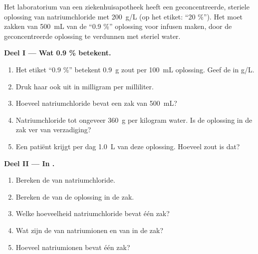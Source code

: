 \begin{problem}
\label{pb:g10:concentration-and-dilution:1}
Het laboratorium van een ziekenhuisapotheek heeft een geconcentreerde,
steriele oplossing van natriumchloride met \qty{200}{g/L} (op het
etiket: ``20 \%''). Het moet zakken van \qty{500}{mL} van de ``0.9 \%''
oplossing voor infusen maken, door de geconcentreerde oplossing te
verdunnen met steriel water.

\medskip
\noindent\textbf{Deel I --- Wat 0.9 \% betekent.}
\begin{enumerate}
  \item Het etiket ``0.9 \%'' betekent \qty{0.9}{g} zout per
        \qty{100}{mL} oplossing. Geef de  in \si{g/L}.
  \item Druk haar ook uit in milligram per milliliter.
  \item Hoeveel natriumchloride bevat een zak van \qty{500}{mL}?
  \item Natriumchloride  tot ongeveer \qty{360}{g} per kilogram
        water. Is de oplossing in de zak ver van verzadiging?
  \item Een patiënt krijgt per dag \qty{1.0}{L} van deze oplossing.
        Hoeveel zout is dat?
\end{enumerate}

\medskip
\noindent\textbf{Deel II --- In .}
\begin{enumerate}[resume]
  \item Bereken de  van natriumchloride.
  \item Bereken de  van de oplossing in de zak.
  \item Welke hoeveelheid natriumchloride bevat één zak?
  \item Wat zijn de  van natriumionen en van
         in de zak?
  \item Hoeveel natriumionen bevat één zak?
\end{enumerate}


\end{problem}
